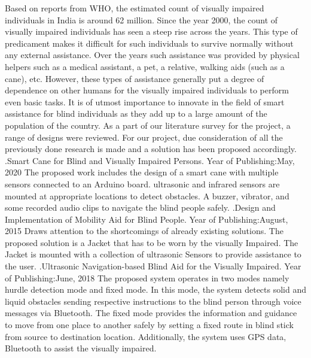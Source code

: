 \documentclass[conference]{IEEEtran}
\begin{document}
Based on reports from WHO, the estimated count of visually impaired individuals in India is around 62 million. Since the year 2000, the count of visually impaired individuals has seen a steep rise across the years. This type of predicament makes it difficult for such individuals to survive normally without any external assistance. Over the years such assistance was provided by physical helpers such as a medical assistant, a pet, a relative, walking aids (such as a cane), etc. However, these types of assistance generally put a degree of dependence on other humans for the visually impaired individuals to perform even basic tasks. It is of utmost importance to innovate in the field of smart assistance for blind individuals as they add up to a large amount of the population of the country. As a part of our literature survey for the project, a range of designs were reviewed. For our project, due consideration of all the previously done research is made and a solution has been proposed accordingly.\newline
\newline[1].Smart Cane for Blind and Visually Impaired Persons. Year of Publishing:May, 2020 \newline
\newline The proposed work includes the design of a smart cane with multiple sensors connected to an Arduino board. ultrasonic and infrared sensors are mounted at appropriate locations to detect obstacles. A buzzer, vibrator, and some recorded audio clips to navigate the blind people safely.\newline
\newline[2].Design and Implementation of Mobility Aid for Blind People. Year of Publishing:August, 2015 \newline
\newline Draws attention to the shortcomings of already existing solutions. The proposed solution is a Jacket that has to be worn by the visually Impaired. The Jacket is mounted with a collection of ultrasonic Sensors to provide assistance to the user. \newline
\newline[3].Ultrasonic Navigation-based Blind Aid for the Visually Impaired. Year of Publishing:June, 2018
\newline The proposed system operates in two modes namely hurdle detection mode and fixed mode. In this mode, the system detects solid and liquid obstacles sending respective instructions to the blind person through voice messages via Bluetooth. The fixed mode provides the information and guidance to move from one place to another safely by setting a fixed route in blind stick from source to destination location. Additionally, the system uses GPS data, Bluetooth to assist the visually impaired. \newline
\end{document}
